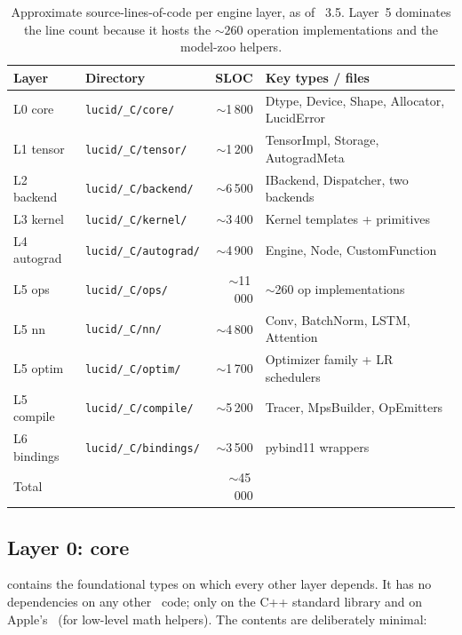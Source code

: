 \begin{table}[t]
\centering
\small
\begin{tabular}{llrl}
\toprule
Layer & Directory & SLOC & Key types / files \\
\midrule
L0 core      & \texttt{lucid/\_C/core/}     & $\sim$1\,800  & Dtype, Device, Shape, Allocator, LucidError \\
L1 tensor    & \texttt{lucid/\_C/tensor/}   & $\sim$1\,200  & TensorImpl, Storage, AutogradMeta \\
L2 backend   & \texttt{lucid/\_C/backend/}  & $\sim$6\,500  & IBackend, Dispatcher, two backends \\
L3 kernel    & \texttt{lucid/\_C/kernel/}   & $\sim$3\,400  & Kernel templates + primitives \\
L4 autograd  & \texttt{lucid/\_C/autograd/} & $\sim$4\,900  & Engine, Node, CustomFunction \\
L5 ops       & \texttt{lucid/\_C/ops/}      & $\sim$11\,000 & $\sim$260 op implementations \\
L5 nn        & \texttt{lucid/\_C/nn/}       & $\sim$4\,800  & Conv, BatchNorm, LSTM, Attention \\
L5 optim     & \texttt{lucid/\_C/optim/}    & $\sim$1\,700  & Optimizer family + LR schedulers \\
L5 compile   & \texttt{lucid/\_C/compile/}  & $\sim$5\,200  & Tracer, MpsBuilder, OpEmitters \\
L6 bindings  & \texttt{lucid/\_C/bindings/} & $\sim$3\,500  & pybind11 wrappers \\
\midrule
Total        &                              & $\sim$45\,000 & \\
\bottomrule
\end{tabular}
\caption[Engine SLOC by layer.]{Approximate source-lines-of-code
per engine layer, as of \Lucid\ 3.5. Layer~5 dominates the line
count because it hosts the \(\sim 260\) operation implementations
and the model-zoo helpers.}
\label{tab:layered_dag:files}
\end{table}

\subsection{Layer 0: core}
\label{ssec:layered_dag:core}

 contains the foundational types on which
every other layer depends. It has no dependencies on any other
\Lucid\ code; only on the C++ standard library and on Apple's
\Accelerate\ (for low-level math helpers). The contents are
deliberately minimal:

